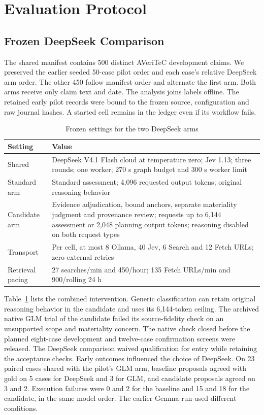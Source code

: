 \documentclass[conference]{IEEEtran}
\begin{document}
\section{Evaluation Protocol}
\subsection{Frozen DeepSeek Comparison}
The shared manifest contains 500 distinct AVeriTeC development claims. We preserved the earlier seeded 50-case pilot order and each case's relative DeepSeek arm order. The other 450 follow manifest order and alternate the first arm. Both arms receive only claim text and date. The analysis joins labels offline. The retained early pilot records were bound to the frozen source, configuration and raw journal hashes. A started cell remains in the ledger even if its workflow fails.

\begin{table}[t]
\caption{Frozen settings for the two DeepSeek arms}
\label{tab:deepseek-settings}
\centering
\footnotesize
\begin{tabular}{@{}p{}p{}@{}}
\toprule
Setting & Value\\
\midrule
Shared & DeepSeek V4.1 Flash cloud at temperature zero; Jev 1.13; three rounds; one worker; 270 s graph budget and 300 s worker limit\\
Standard arm & Standard assessment; 4,096 requested output tokens; original reasoning behavior\\
Candidate arm & Evidence adjudication, bound anchors, separate materiality judgment and provenance review; requests up to 6,144 assessment or 2,048 planning output tokens; reasoning disabled on both request types\\
Transport & Per cell, at most 8 Ollama, 40 Jev, 6 Search and 12 Fetch URLs; zero external retries\\
Retrieval pacing & 27 searches/min and 450/hour; 135 Fetch URLs/min and 900/rolling 24 h\\
\bottomrule
\end{tabular}
\end{table}

Table~\ref{tab:deepseek-settings} lists the combined intervention. Generic classification can retain original reasoning behavior in the candidate and uses its 6,144-token ceiling. The archived native GLM trial of the candidate failed its source-fidelity check on an unsupported scope and materiality concern. The native check closed before the planned eight-case development and twelve-case confirmation screens were released. The DeepSeek comparison waived qualification for entry while retaining the acceptance checks. Early outcomes influenced the choice of DeepSeek. On 23 paired cases shared with the pilot's GLM arm, baseline proposals agreed with gold on 5 cases for DeepSeek and 3 for GLM, and candidate proposals agreed on 3 and 2. Execution failures were 0 and 2 for the baseline and 15 and 18 for the candidate, in the same model order. The earlier Gemma run used different conditions.
\end{document}
